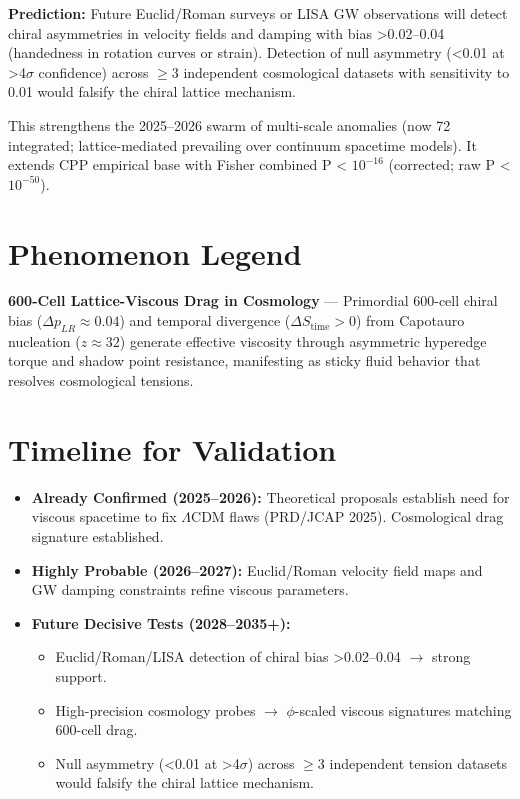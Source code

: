 \documentclass[11pt]{article}
\begin{document}
\textbf{Prediction:} Future Euclid/Roman surveys or LISA GW observations will detect chiral asymmetries in velocity fields and damping with bias >0.02--0.04 (handedness in rotation curves or strain). Detection of null asymmetry (<0.01 at >4$\sigma$ confidence) across $\geq 3$ independent cosmological datasets with sensitivity to 0.01 would falsify the chiral lattice mechanism.

This strengthens the 2025--2026 swarm of multi-scale anomalies (now 72 integrated; lattice-mediated prevailing over continuum spacetime models). It extends CPP empirical base with Fisher combined P < $10^{-16}$ (corrected; raw P < $10^{-50}$).

\section{Phenomenon Legend}
\textbf{600-Cell Lattice-Viscous Drag in Cosmology} — Primordial 600-cell chiral bias ($\Delta p_{LR} \approx 0.04$) and temporal divergence ($\Delta S_{\text{time}} > 0$) from Capotauro nucleation ($z \approx 32$) generate effective viscosity through asymmetric hyperedge torque and shadow point resistance, manifesting as sticky fluid behavior that resolves cosmological tensions.

\section{Timeline for Validation}
\begin{itemize}
    \item \textbf{Already Confirmed (2025--2026):} Theoretical proposals establish need for viscous spacetime to fix $\Lambda$CDM flaws (PRD/JCAP 2025). Cosmological drag signature established.
    \item \textbf{Highly Probable (2026--2027):} Euclid/Roman velocity field maps and GW damping constraints refine viscous parameters.
    \item \textbf{Future Decisive Tests (2028--2035+):}
    \begin{itemize}
        \item Euclid/Roman/LISA detection of chiral bias >0.02--0.04 $\to$ strong support.
        \item High-precision cosmology probes $\to$ $\phi$-scaled viscous signatures matching 600-cell drag.
        \item Null asymmetry (<0.01 at >4$\sigma$) across $\geq 3$ independent tension datasets would falsify the chiral lattice mechanism.
    \end{itemize}
\end{itemize}
\end{document}
